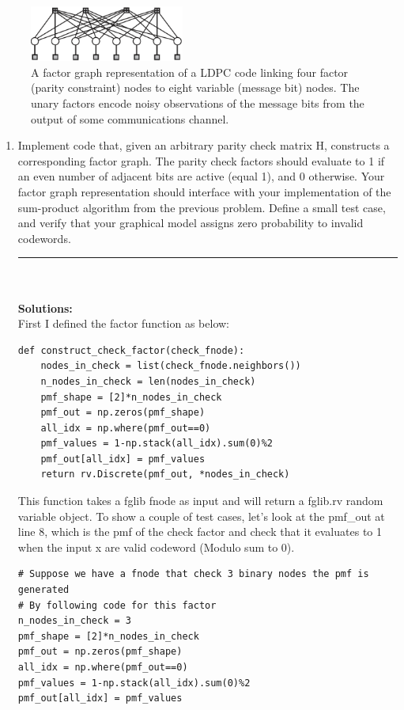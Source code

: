 \documentclass{article}
\begin{document}
\begin{enumerate}
\begin{figure}[t]
\centering
\includegraphics[width=2in]{brown_hw2}
\caption{A factor graph representation of a LDPC code linking four factor (parity constraint)
nodes to eight variable (message bit) nodes. The unary factors encode noisy observations of the
message bits from the output of some communications channel. \cite{Brown}}
\label{fig:factor}
\end{figure}

\begin{enumerate}
\item Implement code that, given an arbitrary parity check matrix H, constructs a corresponding factor graph. The parity check factors should evaluate to 1 if an even number of adjacent bits are active (equal 1), and 0 otherwise. Your factor graph representation should interface with your implementation of the sum-product algorithm from the previous problem. Define a small test case, and verify that your graphical model assigns zero probability to invalid codewords.
\\
\noindent\rule{14cm}{2pt}
\\
\\
\textbf{Solutions:}
\\
First I defined the factor function as below:
\begin{verbatim}
def construct_check_factor(check_fnode):
    nodes_in_check = list(check_fnode.neighbors())
    n_nodes_in_check = len(nodes_in_check)
    pmf_shape = [2]*n_nodes_in_check
    pmf_out = np.zeros(pmf_shape)
    all_idx = np.where(pmf_out==0)
    pmf_values = 1-np.stack(all_idx).sum(0)%2
    pmf_out[all_idx] = pmf_values
    return rv.Discrete(pmf_out, *nodes_in_check)
\end{verbatim}
This function takes a fglib fnode as input and will return a fglib.rv random variable object. To show a couple of test cases, let's look at the pmf\_out at line 8, which is the pmf of the check factor and check that it evaluates to 1 when the input x are valid codeword (Modulo sum to 0). 

\begin{verbatim}
# Suppose we have a fnode that check 3 binary nodes the pmf is generated 
# By following code for this factor
n_nodes_in_check = 3
pmf_shape = [2]*n_nodes_in_check
pmf_out = np.zeros(pmf_shape)
all_idx = np.where(pmf_out==0)
pmf_values = 1-np.stack(all_idx).sum(0)%2
pmf_out[all_idx] = pmf_values


\end{verbatim}
\end{enumerate}
\end{enumerate}
\end{document}
